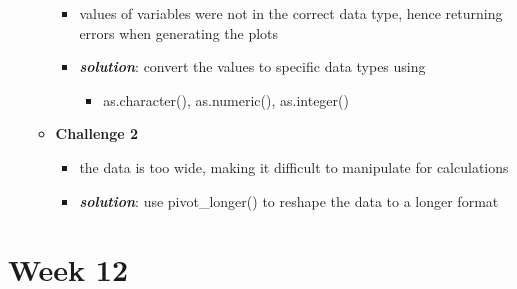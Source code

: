 \documentclass[
]{article}
\providecommand{\tightlist}{%
  \setlength{\itemsep}{0pt}\setlength{\parskip}{0pt}}
\begin{document}
\begin{enumerate}
\begin{itemize}
    \begin{itemize}
    \item
      values of variables were not in the correct data type, hence
      returning errors when generating the plots
    \item
      \textbf{\emph{solution}}: convert the values to specific data
      types using

      \begin{itemize}
      \tightlist
      \item
        as.character(), as.numeric(), as.integer()
      \end{itemize}
    \end{itemize}
  \item
    \textbf{Challenge 2}

    \begin{itemize}
    \item
      the data is too wide, making it difficult to manipulate for
      calculations
    \item
      \textbf{\emph{solution}}: use pivot\_longer() to reshape the data
      to a longer format
    \end{itemize}
  \end{itemize}
\end{enumerate}

\hypertarget{week-12}{%
\section{Week 12}\label{week-12}}
\end{document}
